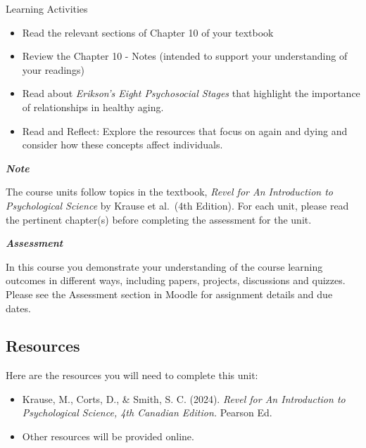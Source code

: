 \documentclass[
]{book}
\providecommand{\tightlist}{%
  \setlength{\itemsep}{0pt}\setlength{\parskip}{0pt}}
\begin{document}
\begin{reflect}
{Learning Activities}

\begin{itemize}
\tightlist
\item
  Read the relevant sections of Chapter 10 of your textbook
\item
  Review the Chapter 10 - Notes (intended to support your understanding of your readings)
\item
  Read about \emph{Erikson's Eight Psychosocial Stages} that highlight the importance of relationships in healthy aging.
\item
  Read and Reflect: Explore the resources that focus on again and dying and consider how these concepts affect individuals.
\end{itemize}
\end{reflect}

\begin{caution}
\textbf{\emph{Note}}

The course units follow topics in the textbook, \emph{Revel for An Introduction to Psychological Science} by Krause et al.~(4th Edition). For each unit, please read the pertinent chapter(s) before completing the assessment for the unit.
\end{caution}

\begin{assessment}
\textbf{\emph{Assessment}}

In this course you demonstrate your understanding of the course learning outcomes in different ways, including papers, projects, discussions and quizzes. Please see the Assessment section in Moodle for assignment details and due dates.
\end{assessment}

\hypertarget{resources-3}{%
\subsection*{Resources}\label{resources-3}}

Here are the resources you will need to complete this unit:

\begin{itemize}
\tightlist
\item
  Krause, M., Corts, D., \& Smith, S. C. (2024). \emph{Revel for An Introduction to Psychological Science, 4th Canadian Edition.} Pearson Ed.
\item
  Other resources will be provided online.
\end{itemize}
\end{document}
